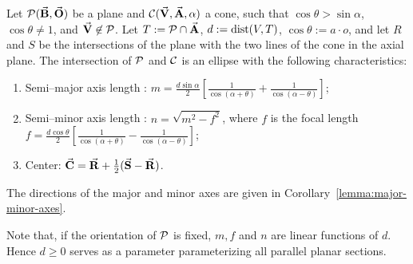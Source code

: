 \begin{theorem}
\label{theorem:cone-ellipse}
Let ${\cal P}(\vec{\bf B},\vec{\bf O})$ be a plane and 
${\cal C}(\vec{\bf V},\vec{\bf A},\alpha)$ a cone, such that
$\cos\theta>\sin\alpha$, $\cos\theta\neq 1$, and $\vec{\bf V}\not\in{\cal P}$.
Let $T := {\cal P} \cap \vec{\bf A}$,
$d := {\rm dist}(V,T)$,
$\cos \theta := a \cdot o$, and
let $R$ and $S$ be the intersections of the plane with the two lines 
of the cone in the axial plane.
The intersection of ${\cal P}$ and ${\cal C}$
is an ellipse with the following characteristics:
\begin{enumerate}
     \item Semi--major axis length : 
	$m=\frac{d\sin\alpha}{2}\left[ \frac{1}{\cos(\alpha+\theta)}+
           \frac{1}{\cos(\alpha-\theta)}\right]$;
     \item Semi--minor axis length : $n=\sqrt{m^2-f^2}$, 
	where $f$ is the focal length \\
	$f = \frac{d\cos\theta}{2}\left[ \frac{1}{\cos(\alpha+\theta)}-
             \frac{1}{\cos(\alpha-\theta)}\right]$;
     \item Center: $\vec{\bf C}=\vec{\bf R}+\frac{1}{2}(\vec{\bf S}-\vec{\bf R})$.
\end{enumerate}
The directions of the major and minor axes are given in 
Corollary~\ref{lemma:major-minor-axes}.
\end{theorem}

     Note that, if the orientation of ${\cal P}$ is fixed, $m, f$ and $n$
are linear functions of $d$.  Hence  $d\geq 0$ serves as a parameter
parameterizing all parallel planar sections.

